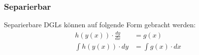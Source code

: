 \subsubsection{Separierbar} \label{sec:separierbareDGL}
    Separierbare DGLs können auf folgende Form gebracht werden:
    \begin{align*}
        h(y(x)) \cdot \frac{dy}{dx} &= g(x)\\
        \int h(y(x)) \cdot dy &= \int g(x) \cdot dx
    \end{align*}